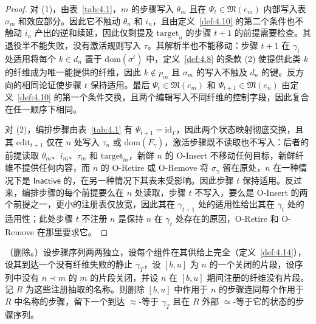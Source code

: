\begin{proof}
对 (1)，由表~\ref{tab:4.1}，$m$ 的步骤写入 $\theta_m$ 且在 $\Psi_t \in \mathfrak{M}(e_m)$ 内部写入表 $\sigma_m$ 和效应部分。因此它不触动 $\theta_n$ 和 $i_n$，且由定义~\ref{def:4.10} 的第二个条件也不触动 $i_n$ 产出的逆和续延，因此仅剩提及 $\mathrm{target}_n$ 的步骤 $t + 1$ 的前提需要检查。其退役半不能失败，没有激活规则写入 $\tau$。其解析半也不能移动：步骤 $t + 1$ 在 $\gamma_t$ 处适用将每个 $k \in d_n$ 置于 $\mathrm{dom}(\sigma^t)$ 中，定义~\ref{def:4.8} 的条款 (2) 使提供此类 $k$ 的纤维成为唯一能提供的纤维，因此 $k \notin p_m$ 且 $\sigma_m$ 的写入不触及 $d_n$ 的键。反方向的相同论证使步骤 $t$ 保持适用。最后 $\Psi_t \in \mathfrak{M}(e_m)$ 和 $\Psi_{t+1} \in \mathfrak{M}(e_n)$ 由定义~\ref{def:4.10} 的第一个条件交换，且两个编辑写入不同纤维的控制字段，因此复合在任一顺序下相同。

对 (2)，编排步骤由表~\ref{tab:4.1} 有 $\Psi_{t+1} = \mathrm{id}_\Gamma$，因此两个状态映射彻底交换，且其 $\mathrm{edit}_{t+1}$ 仅在 $n$ 处写入 $\tau_n$ 或 $\mathrm{dom}(F_\gamma)$，激活步骤既不读取也不写入：后者的前提读取 $\theta_m$、$i_m$、$\tau_m$ 和 $\mathrm{target}_m$，新鲜 $n$ 的 O-Insert 不移动任何目标，新鲜纤维不提供任何内容，而 $n$ 的 O-Retire 或 O-Remove 将 $\sigma_\gamma$ 留在原处，$n$ 在一种情况下是 $\mathsf{Inactive}$ 的，在另一种情况下其表未受影响。因此步骤 $t$ 保持适用。反过来，编排步骤的每个前提要么在 $n$ 处读取，步骤 $t$ 不写入，要么是 O-Insert 的两个前提之一，更小的注册表仅放宽，因此其在 $\gamma_{t+1}$ 处的适用性给出其在 $\gamma_t$ 处的适用性；此处步骤 $t$ 不注册 $n$ 是保持 $n$ 在 $\gamma_t$ 处存在的原因，O-Retire 和 O-Remove 在那里要求它。
\end{proof}

\begin{lemma}\label{lem:4.9}
（删除。）设步骤序列两两独立，设每个组件在其供给上完全（定义~\ref{def:4.14}），设其到达一个没有纤维失败的静止 $\gamma_T$，设 $[b, u]$ 为 $n$ 的一个关闭的片段，设序列中没有 $n \prec m$ 的 $m$ 的片段关闭，并设 $n$ 在 $[b, u]$ 期间注册的纤维没有片段。记 $R$ 为这些注册抽取的名称。则删除 $[b, u]$ 中作用于 $n$ 的步骤连同每个作用于 $R$ 中名称的步骤，留下一个到达 $\approx$-等于 $\gamma_T$ 且在 $R$ 外部 $\simeq$-等于它的状态的步骤序列。
\end{lemma}

